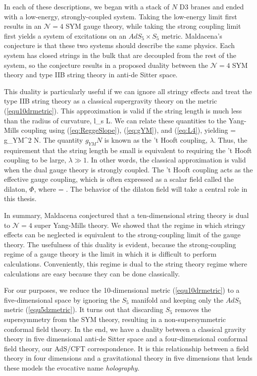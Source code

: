 In each of these descriptions, we began with a stack of $N$ D3 branes and ended with a low-energy, strongly-coupled system.
Taking the low-energy limit first results in an $\mathcal{N}=4$ SYM gauge theory, while taking the strong coupling limit first yields a system of excitations on an $AdS_5 \times S_5$ metric.
Maldacena's conjecture is that these two systems should describe the same physics.
Each system has closed strings in the bulk that are decoupled from the rest of the system, so the conjecture results in a proposed duality between the $\mathcal{N}=4$ SYM theory and type IIB string theory in anti-de Sitter space.

This duality is particularly useful if we can ignore all stringy effects and treat the type IIB string theory as a classical supergravity theory on the metric (\ref{equ10drmetric}). 
This approximation is valid if the string length is much less than the radius of curvature,
\be
l_s \ll L.
\ee
We can relate these quantities to the Yang-Mills coupling using (\ref{eq:ReggeSlope}), (\ref{eq:gYM}), and (\ref{eq:L4}), yielding
\be
{} = g_{YM}^2 N.
\ee
The quantity $g_{YM} N$ is known as the 't Hooft coupling, $\lambda$.
Thus, the requirement that the string length be small is equivalent to requiring the 't Hooft coupling to be large, $\lambda \gg 1$.
In other words, the classical approximation is valid when the dual gauge theory is strongly coupled.
The 't Hooft coupling acts as the effective gauge coupling, which is often expressed as a scalar field called the dilaton, $\Phi$, where
\be
\Phi = \log \lambda.
\ee
The behavior of the dilaton field will take a central role in this thesis.

In summary, Maldacena conjectured that a ten-dimensional string theory is dual to $\mathcal{N} = 4 $ super Yang-Mills theory.
We showed that the regime in which stringy effects can be neglected is equivalent to the strong-coupling limit of the gauge theory.
The usefulness of this duality is evident, because the strong-coupling regime of a gauge theory is the limit in which it is difficult to perform calculations.
Conveniently, this regime is dual to the string theory regime where calculations are easy because they can be done classically.

For our purposes, we reduce the 10-dimensional metric (\ref{equ10drmetric}) to a five-dimensional space by ignoring the $S_5$ manifold and keeping only the $AdS_5$ metric (\ref{equ5dzmetric}).
It turns out that discarding $S_5$ removes the supersymmetry from the SYM theory, resulting in a non-supersymmetric conformal field theory.
In the end, we have a duality between a classical gravity theory in five dimensional anti-de Sitter space and a four-dimensional conformal field theory, our AdS/CFT correspondence.
It is this relationship between a field theory in four dimensions and a gravitational theory in five dimensions that lends these models the evocative name \emph{holography}.

